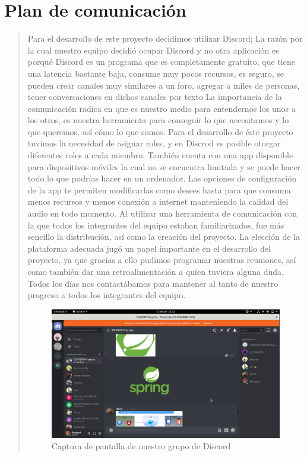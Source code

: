 \documentclass[14pt,a4paper]{article}
\begin{document}
\section{Plan de comunicación}
\vspace{0.5 cm}
\begin{verse}
Para el desarrollo de este proyecto decidimos utilizar Discord; La razón por la cual nuestro equipo decidió ocupar Discord y no otra aplicación es porqué Discord es un programa que es completamente gratuito, que tiene una latencia bastante baja, consume muy pocos recursos, es seguro, se pueden crear canales muy similares a un foro, agregar a miles de personas, tener conversaciones en dichos canales por texto La importancia de la comunicación radica en que es nuestro medio para entendernos los unos a los otros, es nuestra herramienta para conseguir lo que necesitamos y lo que queremos, así cómo lo que somos. 
Para el desarrollo de éste proyecto tuvimos la necesidad de asignar roles, y en Discrod es posible otorgar diferentes roles a cada miembro. También cuenta con una app disponible para dispositivos móviles la cual no se encuentra limitada y se puede hacer todo lo que podrías hacer en un ordenador. Las opciones de configuración de la app te permiten modificarlas como desees hasta para que consuma menos recursos y menos conexión a internet manteniendo la calidad del audio en todo momento.
Al utilizar una herramienta de comunicación con la que todos los integrantes del equipo estaban familiarizados, fue más sencillo la distribución, así como la creación del proyecto. La elección de la plataforma adecuada jugó un papel importante en el desarrollo del proyecto, ya que gracias a ello pudimos programar nuestras reuniones, así como también dar una retroalimentación a quien tuviera alguna duda. Todos los días nos contactábamos para mantener al tanto de nuestro progreso a todos los integrantes del equipo.
\begin{figure}[htb]


\includegraphics[scale=0.3]{Captura de pantalla de 2020-10-12 18-22-20.png} 

\caption{Captura de pantalla de nuestro grupo de Discord}
\label{fig:captura}
\end{figure}

\end{verse}
 
\end{document}
